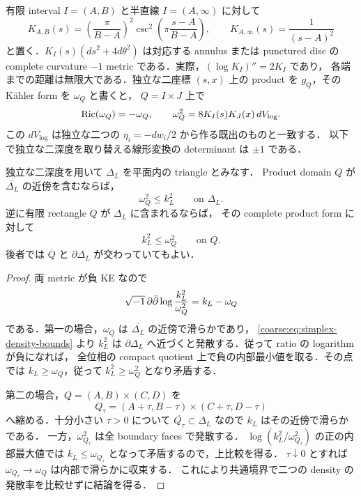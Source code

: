 有限 interval $I=(A,B)$ と半直線 $I=(A,\infty)$ に対して
\begin{equation}\label{simplex:eq:interval-coefficient}
 K_{A,B}(s)=\left(\frac{\pi}{B-A}\right)^2
       \csc^2\left(\pi\frac{s-A}{B-A}\right),
 \qquad
 K_{A,\infty}(s)=\frac1{(s-A)^2}
\end{equation}
と置く．$K_I(s)(ds^2+4d\theta^2)$ は対応する annulus または punctured disc の
complete curvature $-1$ metric である．実際，$(\log K_I)''=2K_I$ であり，
各端までの距離は無限大である．独立な二座標 $(s,x)$ 上の product を
$g_Q$，その K\"ahler form を $\omega_Q$ と書くと，
$Q=I\times J$ 上で
\begin{equation}\label{simplex:eq:product-volume}
 \operatorname{Ric}(\omega_Q)=-\omega_Q,\qquad
 \omega_Q^2=8K_I(s)K_J(x)\,dV_{\log}.
\end{equation}
この $dV_{\log}$ は独立な二つの $\eta_i=-dw_i/2$ から作る既出のものと一致する．
以下で独立な二深度を取り替える線形変換の determinant は $\pm1$ である．

\begin{lemma}
\label{simplex:lem:product-volume-monotonicity}
独立な二深度を用いて $\Delta_L$ を平面内の triangle とみなす．
Product domain $Q$ が $\overline{\Delta_L}$ の近傍を含むならば，
\[
 \omega_Q^2\le k_L^2\qquad\text{on }\Delta_L.
\]
逆に有限 rectangle $Q$ が $\Delta_L$ に含まれるならば，
その complete product form に対して
\[
 k_L^2\le\omega_Q^2\qquad\text{on }Q.
\]
後者では $\overline Q$ と $\partial\Delta_L$ が交わっていてもよい．
\end{lemma}

\begin{proof}
両 metric が負 KE なので
\[
 \sqrt{-1}\,\partial\bar\partial\log\frac{k_L^2}{\omega_Q^2}=k_L-\omega_Q
\]
である．第一の場合，$\omega_Q$ は $\overline{\Delta_L}$ の近傍で滑らかであり，
\eqref{coarse:eq:simplex-density-bounds} より $k_L^2$ は
$\partial\Delta_L$ へ近づくと発散する．従って ratio の logarithm が負になれば，
全位相の compact quotient 上で負の内部最小値を取る．その点では
$k_L\ge\omega_Q$，従って $k_L^2\ge\omega_Q^2$ となり矛盾する．

第二の場合，$Q=(A,B)\times(C,D)$ を
\[
 Q_\tau=(A+\tau,B-\tau)\times(C+\tau,D-\tau)
\]
へ縮める．十分小さい $\tau>0$ について
$\overline{Q_\tau}\subset\Delta_L$ なので $k_L$ はその近傍で滑らかである．
一方，$\omega_{Q_\tau}^2$ は全 boundary faces で発散する．
$\log(k_L^2/\omega_{Q_\tau}^2)$ の正の内部最大値では
$k_L\le\omega_{Q_\tau}$ となって矛盾するので，上比較を得る．
$\tau\downarrow0$ とすれば $\omega_{Q_\tau}\to\omega_Q$ は内部で滑らかに収束する．
これにより共通境界で二つの density の発散率を比較せずに結論を得る．
\end{proof}

